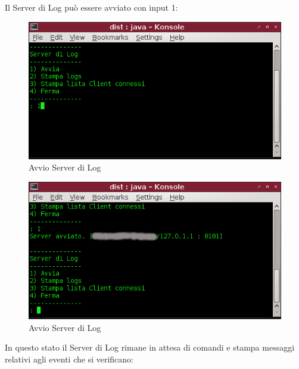\documentclass[a4paper, 11pt]{article} %
\begin{document}
Il Server di Log pu\`o essere avviato con input 1:\\
\vspace{-0.6cm}
\begin{center}
\begin{figure}[H]
\includegraphics[width=1.0\textwidth]{images/server_di_log-2.png}
\vspace{-0.6cm}
\caption{Avvio Server di Log}
\end{figure}
\end{center}
\begin{center}
\begin{figure}[H]
\includegraphics[width=1.0\textwidth]{images/server_di_log-3.png}
\vspace{-0.6cm}
\caption{Avvio Server di Log}
\end{figure}
\end{center}
\vspace{-0.6cm}
In questo stato il Server di Log rimane in attesa di comandi e stampa messaggi relativi agli eventi che si verificano:
\vspace{-0.6cm}
\end{document}
